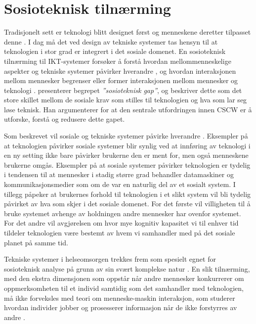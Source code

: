 \section{Sosioteknisk tilnærming}
\label{sec:sosioteknisk}
Tradisjonelt sett er teknologi blitt designet først og menneskene deretter tilpasset denne \citep{Appelbaum97}. I dag må det ved design av tekniske systemer tas hensyn til at teknologien i stor grad er integrert i det sosiale domenet. En sosioteknisk tilnærming til IKT-systemer forsøker å forstå hvordan mellommenneskelige aspekter og tekniske systemer påvirker hverandre \citep{Coiera04}, og hvordan interaksjonen mellom mennesker begrenser eller former interaksjonen mellom mennesker og teknologi \citep{Coiera07}. \citet{Ackerman00} presenterer begrepet \textit{”sosioteknisk gap”}, og beskriver dette som det store skillet mellom de sosiale krav som stilles til teknologien og hva som lar seg løse teknisk. Han argumenterer for at den sentrale utfordringen innen CSCW er å utforske, forstå og redusere dette gapet. 

\noindent
Som beskrevet vil sosiale og tekniske systemer påvirke hverandre \citep{Coiera04}. Eksempler på at teknologien påvirker sosiale systemer blir synlig ved at innføring av teknologi i en ny setting ikke bare påvirker brukerne den er ment for, men også menneskene brukerne omgås. Eksempler på at sosiale systemer påvirker teknologien er tydelig i tendensen til at mennesker i stadig større grad behandler datamaskiner og kommunikasjonsmedier som om de var en naturlig del av et sosialt system. I tillegg påpeker \citet{Coiera07} at brukernes forhold til teknologien i et slikt system vil bli tydelig påvirket av hva som skjer i det sosiale domenet. For det første vil villigheten til å bruke systemet avhenge av holdningen andre mennesker har ovenfor systemet. For det andre vil avgjørelsen om hvor mye kognitiv kapasitet vi til enhver tid tildeler teknologien være bestemt av hvem vi samhandler med på det sosiale planet på samme tid.

\noindent
Tekniske systemer i helseomsorgen trekkes frem som spesielt egnet for sosioteknisk analyse på grunn av sin svært komplekse natur \citep{Coiera07, Berg99}.
En slik tilnærming, med den ekstra dimensjonen som oppstår når andre mennesker konkurrerer om oppmerksomheten til et individ samtidig som det samhandler med teknologien, må ikke forveksles med teori om menneske-maskin interaksjon, som studerer hvordan individer jobber og prosesserer informasjon når de ikke forstyrres av andre \citep{Coiera07}.
